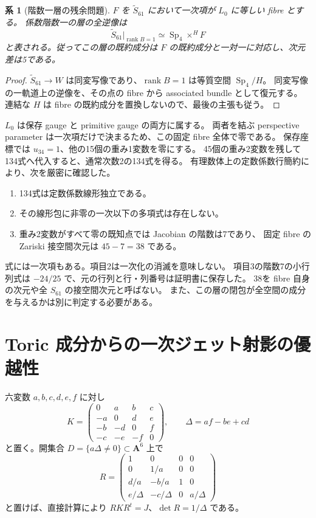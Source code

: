 \documentclass[11pt,a4paper]{ltjsarticle}
\renewcommand{\AA}{\mathbf A}
\DeclareMathOperator{\Sp}{Sp}
\DeclareMathOperator{\rank}{rank}
\newtheorem{corollary}[theorem]{系}
\theoremstyle{remark}
\begin{document}
\begin{corollary}[階数一層の残余問題]\label{cor:fiber}
$F$ を $\widetilde S_{61}$ において一次項が $L_0$ に等しい fibre とする。
係数階数一の層の全逆像は
\[
 \widetilde S_{61}|_{\rank B=1}\simeq\Sp_4\times^H F
\]
と表される。従ってこの層の既約成分は $F$ の既約成分と一対一に対応し、次元差は5である。
\end{corollary}
\begin{proof}
$\widetilde S_{61}\to W$ は同変写像であり、$\rank B=1$ は等質空間 $\Sp_4/H$。
同変写像の一軌道上の逆像を、その点の fibre から associated bundle として復元する。
連結な $H$ は fibre の既約成分を置換しないので、最後の主張も従う。
\end{proof}

$L_0$ は保存 gauge と primitive gauge の両方に属する。
両者を結ぶ perspective parameter は一次項だけで決まるため、この固定 fibre 全体で零である。
保存座標では $u_{34}=1$、他の15個の重み1変数を零にする。
45個の重み2変数を残して134式へ代入すると、通常次数2の134式を得る。
有理数体上の定数係数行簡約により、次を厳密に確認した\cite{fiber-certificate}。
\begin{enumerate}
\item 134式は定数係数線形独立である。
\item その線形包に非零の一次以下の多項式は存在しない。
\item 重み2変数がすべて零の既知点では Jacobian の階数は7であり、
      固定 fibre の Zariski 接空間次元は $45-7=38$ である。
\end{enumerate}
式には一次項もある。項目2は一次化の消滅を意味しない。
項目3の階数7の小行列式は $-24/25$ で、元の行列と行・列番号は証明書に保存した。
38を fibre 自身の次元や全 $S_{61}$ の接空間次元と呼ばない。
また、この層の閉包が全空間の成分を与えるかは別に判定する必要がある。

\section{Toric 成分からの一次ジェット射影の優越性}
六変数 $a,b,c,d,e,f$ に対し
\[
 K=\begin{pmatrix}
 0&a&b&c\\-a&0&d&e\\-b&-d&0&f\\-c&-e&-f&0
 \end{pmatrix},\qquad \Delta=af-be+cd
\]
と置く。開集合 $D=\{a\Delta\ne0\}\subset\AA^6$ 上で
\[
 R=\begin{pmatrix}
 1&0&0&0\\0&1/a&0&0\\d/a&-b/a&1&0\\
 e/\Delta&-c/\Delta&0&a/\Delta
 \end{pmatrix}
\]
と置けば、直接計算により $RK R^t=J$、$\det R=1/\Delta$ である。
\end{document}
